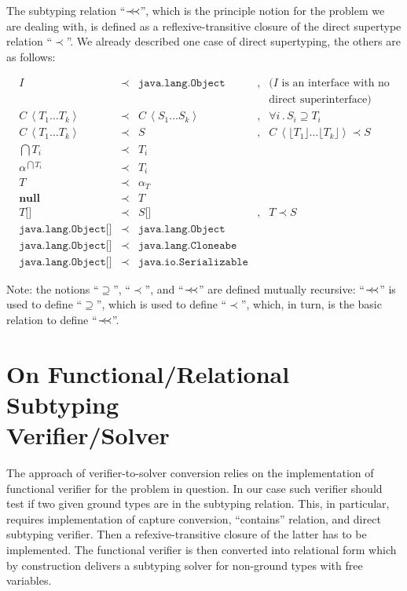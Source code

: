\documentclass{article}
\newcommand{\precprec}{\prec\mathrel{\mkern-5mu}\prec}
\newcommand{\grc}[2]{{#1}\,\left<{#2}\right>}
\newcommand{\java}[1]{\texttt{#1}}
\newcommand{\primi}[1]{\mathbf{#1}}
\newcommand{\cc}[1]{\lfloor{#1}\rfloor}
\begin{document}
The subtyping relation ``$\precprec$'', which is the principle notion for the problem we are dealing with, is defined as a reflexive-transitive
closure of the direct supertype relation ``$\prec$''. We already described one case of direct supertyping, the others are as follows:

\[
\begin{array}{rclcl}
  I & \prec & \java{java.lang.Object} &,& \mbox{($I$ is an interface with no}\\
    &       &                         & &\mbox{direct superinterface)}\\[2mm]
  \grc{C}{T_1\dots T_k} & \prec & \grc{C}{S_1\dots S_k} &,& \forall i\, .\, S_i\supseteq T_i\\[2mm]
  \grc{C}{T_1\dots T_k} & \prec & S &,& \grc{C}{\cc{T_1}\dots \cc{T_k}}\prec S\\[2mm]
  \bigcap T_i & \prec & T_i && \\[2mm]
  \alpha^{\bigcap T_i} & \prec & T_i &&\\[2mm]
  T & \prec & \alpha_T && \\[2mm]
  \primi{null} & \prec & T &&\\[2mm]
  T\java{[]} & \prec & S\java{[]} &,& T\prec S\\[2mm]
  \java{java.lang.Object[]} & \prec & \java{java.lang.Object} &&  \\[2mm]
  \java{java.lang.Object[]} & \prec & \java{java.lang.Cloneabe} && \\[2mm]
  \java{java.lang.Object[]} & \prec & \java{java.io.Serializable} &&
\end{array}
\]

Note: the notions ``$\supseteq$'', ``$\prec$'', and ``$\precprec$'' are defined mutually recursive: ``$\precprec$'' is used
to define ``$\supseteq$'', which is used to define ``$\prec$'', which, in turn, is the basic relation to define ``$\precprec$''.

\section{On Functional/Relational Subtyping\\ Verifier/Solver}

The approach of verifier-to-solver conversion relies on the implementation of functional verifier for the problem in question. In our
case such verifier should test if two given ground types are in the subtyping relation. This, in particular, requires implementation
of capture conversion, ``contains'' relation, and direct subtyping verifier. Then a refexive-transitive closure of the latter has to
be implemented. The functional verifier is then converted into relational form which by construction delivers a subtyping solver for
non-ground types with free variables.
\end{document}
